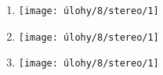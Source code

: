 \begin{enumerate}
	\item
	\begin{minipage}[t]{\linewidth}
		\begin{quote}
			
		\end{quote}
		\centering
		\texttt{[image: úlohy/8/stereo/1]}				
	\end{minipage}
	
	\item
	\begin{minipage}[t]{\linewidth}
		\begin{quote}
			
		\end{quote}
		\centering
		\texttt{[image: úlohy/8/stereo/1]}				
	\end{minipage}
	
	\item
	\begin{minipage}[t]{\linewidth}
		\begin{quote}
			
		\end{quote}
		\centering
		\texttt{[image: úlohy/8/stereo/1]}				
	\end{minipage}
	
\end{enumerate}

\newpage
